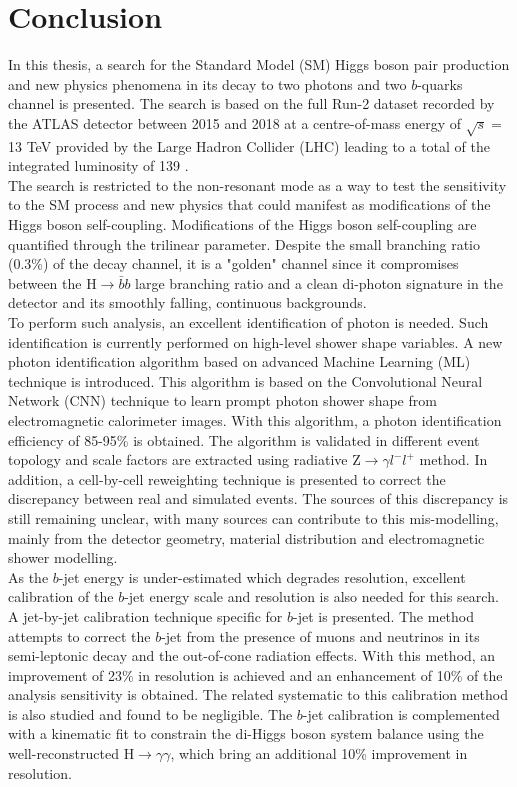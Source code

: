 \newpage
\chapter{Conclusion}

In this thesis, a search for the Standard Model (SM) Higgs boson pair production and new physics phenomena in its decay to two photons and two $b$-quarks channel is presented. The search is based on the full Run-2 dataset recorded by the ATLAS detector between 2015 and 2018 at a centre-of-mass energy of $\sqrt{s} = $ 13 TeV provided by the Large Hadron Collider (LHC) leading to a total of the integrated luminosity of 139 \ifb.  \\

The search is restricted to the non-resonant mode as a way to test the sensitivity to the SM process and new physics that could manifest as modifications of the Higgs boson self-coupling. Modifications of the Higgs boson self-coupling are quantified through the trilinear \kl parameter. Despite the small branching ratio (0.3\%) of the \bbyy decay channel, it is a "golden" channel since it compromises between the H$\to\bar{b}b$ large branching ratio and a clean di-photon signature in the detector and its smoothly falling, continuous backgrounds. \\

To perform such analysis, an excellent identification of photon is needed. Such identification is currently performed on high-level shower shape variables. A new photon identification algorithm based on advanced Machine Learning (ML) technique is introduced. This algorithm is based on the Convolutional Neural Network (CNN) technique to learn prompt photon shower shape from electromagnetic calorimeter images. With this algorithm, a photon identification efficiency of 85-95\% is obtained. The algorithm is validated in different event topology and scale factors are extracted using radiative Z$\to\gamma l^-l^+$ method. In addition, a cell-by-cell reweighting technique is presented to correct the discrepancy between real and simulated events. The sources of this discrepancy is still remaining unclear, with many sources can contribute to this mis-modelling, mainly from the detector geometry, material distribution and electromagnetic shower modelling. \\

As the $b$-jet energy is under-estimated which degrades \mbb resolution, excellent calibration of the $b$-jet energy scale and resolution is also needed for this search. A jet-by-jet calibration technique specific for $b$-jet is presented. The method attempts to correct the $b$-jet from the presence of muons and neutrinos in its semi-leptonic decay and the out-of-cone radiation effects. With this method, an improvement of 23\% in \mbb resolution is achieved and an enhancement of 10\% of the \HHyybb analysis sensitivity is obtained. The related systematic to this calibration method is also studied and found to be negligible. The $b$-jet calibration is complemented with a kinematic fit to constrain the di-Higgs boson system balance using the well-reconstructed H$\to\gamma\gamma$, which bring an additional 10\% improvement in \mbb resolution. \\

